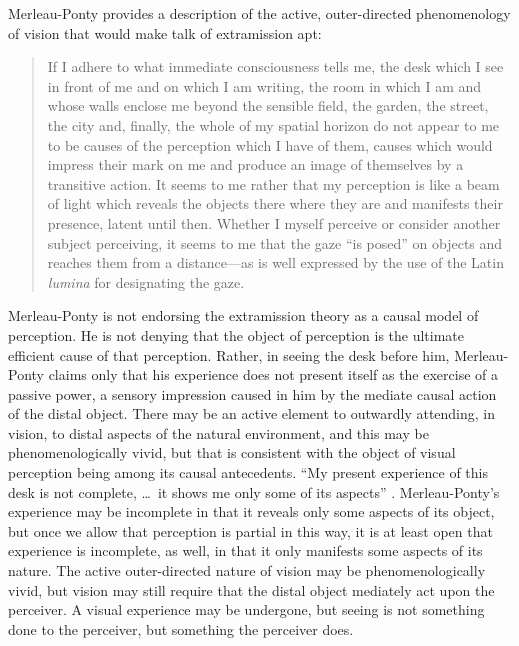 Merleau-Ponty provides a description of the active, outer-directed phenomenology of vision that would make talk of extramission apt:
\begin{quote}
	If I adhere to what immediate consciousness tells me, the desk which I see in front of me and on which I am writing, the room in which I am and whose walls enclose me beyond the sensible field, the garden, the street, the city and, finally, the whole of my spatial horizon do not appear to me to be causes of the perception which I have of them, causes which would impress their mark on me and produce an image of themselves by a transitive action. It seems to me rather that my perception is like a beam of light which reveals the objects there where they are and manifests their presence, latent until then. Whether I myself perceive or consider another subject perceiving, it seems to me that the gaze ``is posed'' on objects and reaches them from a distance---as is well expressed by the use of the Latin \emph{lumina} for designating the gaze. \citep[185]{Merleau-Ponty:1967fj}
\end{quote}
Merleau-Ponty is not endorsing the extramission theory as a causal model of perception. He is not denying that the object of perception is the ultimate efficient cause of that perception. Rather, in seeing the desk before him, Merleau-Ponty claims only that his experience does not present itself as the exercise of a passive power, a sensory impression caused in him by the mediate causal action of the distal object. There may be an active element to outwardly attending, in vision, to distal aspects of the natural environment, and this may be phenomenologically vivid, but that is consistent with the object of visual perception being among its causal antecedents. ``My present experience of this desk is not complete, \ldots\ it shows me only some of its aspects'' \citep[186]{Merleau-Ponty:1967fj}. Merleau-Ponty's experience may be incomplete in that it reveals only some aspects of its object, but once we allow that perception is partial in this way, it is at least open that experience is incomplete, as well, in that it only manifests some aspects of its nature. The active outer-directed nature of vision may be phenomenologically vivid, but vision may still require that the distal object mediately act upon the perceiver. A visual experience may be undergone, but seeing is not something done to the perceiver, but something the perceiver does.

